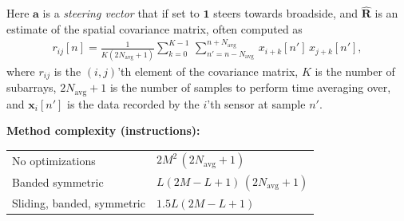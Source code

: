 \documentclass[12pt,journal,captionsoff,onecolumn]{IEEEtran}
\newcommand\sumb[2]{\sum\limits_{#1}^{#2}\,}
\renewcommand\H{^{\scriptscriptstyle H}}
\renewcommand\vec[1]{\boldsymbol{#1}}
\newcommand\mat[1]{\boldsymbol{#1}}
\newcommand\1{\vec 1}
\newcommand*\x{\vec x}
\newcommand*\R{\mat R}
\newcommand*\eR{\mat{\hat R}}
\newcommand*\eRi{\hat{\mat R}\,\!^{-1}}
\newcommand*\Navg{N_\text{avg}}
\begin{document}
% 


\newpage
Here $\vec a$ is a \emph{steering vector} that if set to $\vec 1$ steers towards broadside, and $\hat{\mat R}$ is an estimate of the spatial covariance matrix, often computed as
\begin{gather*}
r_{ij}[n] = \frac{1}{K(2N_{\text{avg}}+1)}\sumb{k=0}{K-1} \sumb{n'=n-N_{\text{avg}}}{n+N_{\text{avg}}} x_{i+k}[n']\,x_{j+k}[n'],
\end{gather*}
where $r_{ij}$ is the $(i,j)$'th element of the covariance matrix, $K$ is the number of subarrays, $2N_{\text{avg}}+1$ is the number of samples to perform time averaging over, and $\vec x_i[n']$ is the data recorded by the $i$'th sensor at sample $n'$. 



{\bf Method complexity (instructions):}\\
\begin{tabular}{l l}
No optimizations            & $2M^2\,(2\Navg+1)$ \\
Banded symmetric            & $L(2M-L+1)\,(2\Navg+1)$ \\
Sliding, banded, symmetric  & $1.5L(2M-L+1)$ \\
\end{tabular}\\\\


% 
% 
\end{document}
